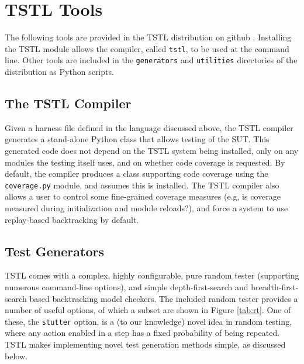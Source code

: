 \section{TSTL Tools}
\label{sec:tools}

The following tools are provided in the TSTL distribution on github \cite{tstl}.  Installing the TSTL module allows the compiler, called {\tt tstl}, to be used at the command line.  Other tools are included in the {\tt generators} and {\tt utilities} directories of the distribution as Python scripts.

\subsection{The TSTL Compiler}

Given a harness file defined in the language discussed above, the TSTL compiler generates a stand-alone Python class that allows testing of the SUT.  This generated code does not depend on the TSTL system being installed, only on any modules the testing itself uses, and on whether code coverage is requested.  By default, the compiler produces a class supporting code coverage using the {\tt coverage.py} module, and assumes this is installed.  The TSTL compiler also allows a user to control some fine-grained coverage measures (e.g, is coverage measured during initialization and module reloads?), and force a system to use replay-based backtracking by default.

\subsection{Test Generators}

TSTL comes with a complex, highly configurable, pure random tester (supporting numerous command-line options), and simple depth-first-search and breadth-first-search based backtracking model checkers.  The included random tester provides a number of useful options, of which a subset are shown in Figure \ref{tab:rt}.  One of these, the {\tt stutter} option, is a (to our knowledge) novel idea in random testing, where any action enabled in a step has a fixed probability of being repeated.  TSTL makes implementing novel test generation methods simple, as discussed below.

